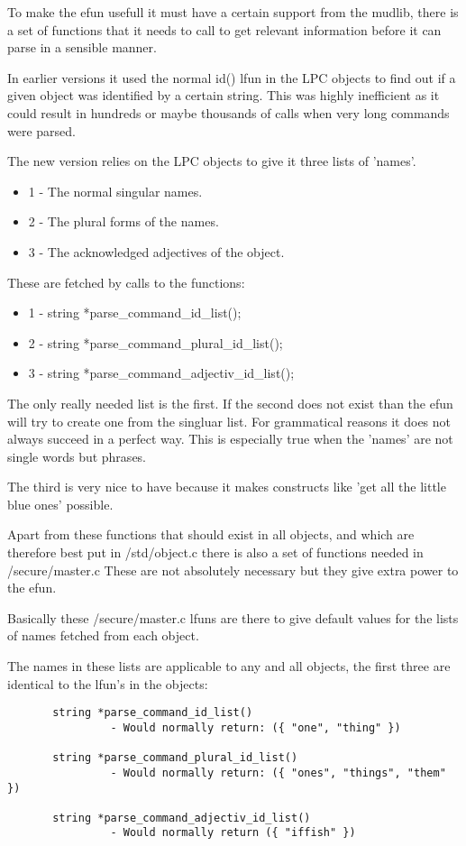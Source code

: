   To make the efun usefull it must have a certain support from the mudlib,
  there is a set of functions that it needs to call to get relevant
  information before it can parse in a sensible manner.

  In earlier versions it used the normal id() lfun in the LPC objects to
  find out if a given object was identified by a certain string. This was
  highly inefficient as it could result in hundreds or maybe thousands of
  calls when very long commands were parsed. 
  
  The new version relies on the LPC objects to give it three lists of 'names'.
  
\begin{itemize}
\item  1 - The normal singular names.
\item  2 - The plural forms of the names.
\item  3 - The acknowledged adjectives of the object.
\end{itemize}

  These are fetched by calls to the functions:

\begin{itemize}
\item    1 - string *parse\_command\_id\_list();
\item    2 - string *parse\_command\_plural\_id\_list();
\item    3 - string *parse\_command\_adjectiv\_id\_list();
\end{itemize}

  The only really needed list is the first. If the second does not exist
  than the efun will try to create one from the singluar list. For 
  grammatical reasons it does not always succeed in a perfect way. This is
  especially true when the 'names' are not single words but phrases.

  The third is very nice to have because it makes constructs like
  'get all the little blue ones' possible.

  Apart from these functions that should exist in all objects, and which
  are therefore best put in /std/object.c there is also a set of functions
  needed in /secure/master.c These are not absolutely necessary but they
  give extra power to the efun.

  Basically these /secure/master.c lfuns are there to give default values
  for the lists of names fetched from each object.

  The names in these lists are applicable to any and all objects, the first
  three are identical to the lfun's in the objects:
  \begin{verbatim}
       string *parse_command_id_list()
                - Would normally return: ({ "one", "thing" })

       string *parse_command_plural_id_list()
                - Would normally return: ({ "ones", "things", "them" })

       string *parse_command_adjectiv_id_list()
                - Would normally return ({ "iffish" })
  \end{verbatim}

